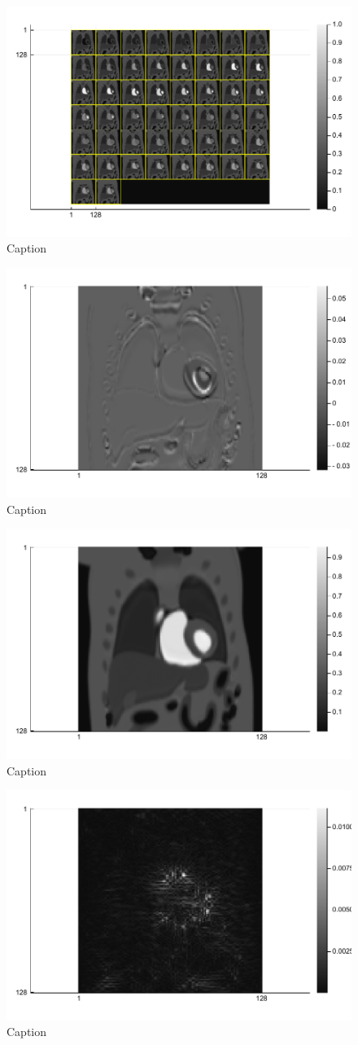 \iffalse
\begin{figure}
    \centering
    \includegraphics[width=0.46\linewidth]{images/PINCAT_all.pdf}
    \caption{Caption}
    \label{fig:PINCAT_all}
\end{figure}

\begin{figure}
    \centering
    \includegraphics[width=0.46\linewidth]{images/PINCAT_diff_t20.pdf}
    \caption{Caption}
    \label{fig:PINCAT_diff_t20}
\end{figure}

\begin{figure}
    \centering
    \includegraphics[width=0.46\linewidth]{images/PINCAT_IRLS_recon.pdf}
    \caption{Caption}
    \label{fig:PINCAT_IRLS_recon}
\end{figure}

\begin{figure}
    \centering
    \includegraphics[width=0.46\linewidth]{images/PINCAT_IRLS_recon_error.pdf}
    \caption{Caption}
    \label{fig:PINCAT_IRLS_recon_error}
\end{figure}

